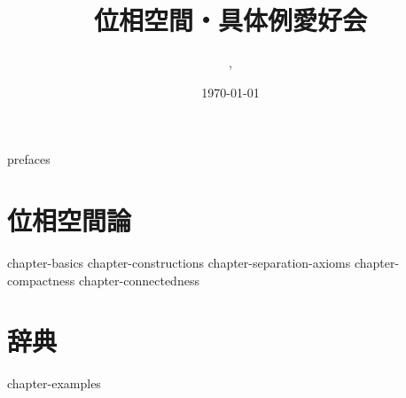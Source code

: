 \documentclass[uplatex, dvipdfmx, a4paper, 12pt]{jsbook}
\begin{document}
\title{位相空間・具体例愛好会}
\author{\ykyki, \chen}
\date{\today}
\maketitle

\makeatletter
\makeatother

{prefaces}
\tableofcontents

\part{位相空間論}
\label{part:theories}
{chapter-basics}
{chapter-constructions}
{chapter-separation-axioms}
{chapter-compactness}
{chapter-connectedness}

\part{辞典}
\label{part:dictionary}
{chapter-examples}

\printindex

\printbibliography[title=参考文献]
\end{document}
